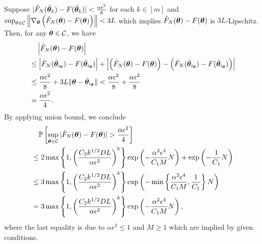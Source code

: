 Suppose $| \hat{F}_N(\bar{{\bm{\theta}}}_k) - F(\bar{{\bm{\theta}}}_k) | < \frac{\alpha \epsilon^2}{8}$  for each $k \in [m]$ and $\sup_{\theta \in \mathcal{C}}\left\lVert \nabla_{\bm{\theta}} \left( \hat{F}_N({\bm{\theta}}) - F({\bm{\theta}}) \right)\right\rVert < 3 L$ which implies $\hat{F}_N({\bm{\theta}})-F({\bm{\theta}})$ is $ 3 L$-Lipschitz. Then, for any ${\bm{\theta}} \in \mathcal{C}$, we have
\begin{align*}
    &\quad \left | \hat{F}_N({\bm{\theta}}) - F({\bm{\theta}}) \right|\\
    &\leq \left | \hat{F}_N(\bar{{\bm{\theta}}}_{i_{\bm{\theta}}}) - F(\bar{{\bm{\theta}}}_{i_{\bm{\theta}}}) \right| +  \left |\left( \hat{F}_N({\bm{\theta}}) - F({\bm{\theta}}) \right) -  \left  (\hat{F}_N(\bar{{\bm{\theta}}}_{i_{\bm{\theta}}}) - F(\bar{{\bm{\theta}}}_{i_{\bm{\theta}}}) \right) \right|\\
    &\leq \frac{\alpha \epsilon^2}{8} + 3 L \lVert {\bm{\theta}} - \bar{{\bm{\theta}}}_{i_{\bm{\theta}}} \rVert < \frac{\alpha \epsilon^2}{8} + \frac{\alpha \epsilon^2}{8} \\&= \frac{\alpha \epsilon^2}{4}.
\end{align*}
By applying union bound, we conclude
\begin{align*}
    &\quad \mathbb{P}\left[ \sup_{{\bm{\theta}} \in \mathcal{C}}|\hat{F}_N({\bm{\theta}}) - F({\bm{\theta}})| >  \frac{\alpha \epsilon^2}{4} \right] \\&\leq 2 \max \left \{1, \left(\frac{C_2k^{1/2} D  L}{\alpha \epsilon^2 }\right)^k \right\} \exp\left(- \frac{\alpha^2 \epsilon^4}{C_1 M}N \right) + \exp\left(-\frac{1}{C_1}N \right)\\ &\leq 3 \max \left \{1, \left(\frac{C_2 k^{1/2} D L}{\alpha \epsilon^2 }\right)^k \right\} \exp \left( - \min \left\{ \frac{\alpha^2 \epsilon^4}{C_1 M}, \frac{1}{C_1}\right \}N \right)\\
    & =  3\max \left \{1, \left(\frac{C_2 k^{1/2} D  L}{\alpha \epsilon^2 }\right)^k \right\} \exp \left( - \frac{\alpha^2 \epsilon^4}{C_1 M}N \right),
\end{align*}
where the last equality is due to $\alpha \epsilon^2 \leq 1$ and $M\geq 1$ which are implied by given conditions.

